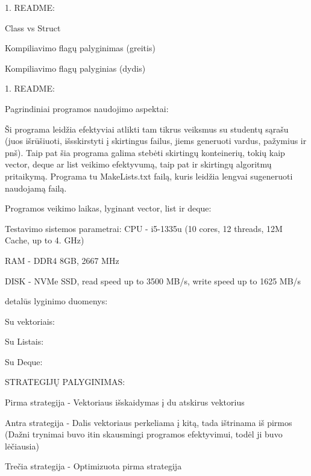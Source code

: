 1. README\+:

Class vs Struct



Kompiliavimo flag\textquotesingle{}ų palyginimas (greitis)



Kompiliavimo flagų palyginias (dydis)



1. README\+:

Pagrindiniai programos naudojimo aspektai\+:

Ši programa leidžia efektyviai atlikti tam tikrus veiksmus su studentų sąrašu (juos išrūšiuoti, išsskirstyti į skirtingus failus, jiems generuoti vardus, pažymius ir pnš). Taip pat šia programa galima stebėti skirtingų konteinerių, tokių kaip vector, deque ar list veikimo efektyvumą, taip pat ir skirtingų algoritmų pritaikymą. Programa tu Make\+Lists.\+txt failą, kuris leidžia lengvai sugeneruoti naudojamą failą.

Programos veikimo laikas, lyginant vector, list ir deque\+:

Testavimo sistemos parametrai\+: CPU -\/ i5-\/1335u (10 cores, 12 threads, 12M Cache, up to 4. GHz)

RAM -\/ DDR4 8GB, 2667 MHz

DISK -\/ NVMe SSD, read speed up to 3500 MB/s, write speed up to 1625 MB/s



detalūs lyginimo duomenys\+:

Su vektoriais\+:

    

Su Listais\+:

    

Su Deque\+:

    

STRATEGIJŲ PALYGINIMAS\+:

Pirma strategija -\/ Vektoriaus išskaidymas į du atskirus vektorius

Antra strategija -\/ Dalis vektoriaus perkeliama į kitą, tada ištrinama iš pirmos (Dažni trynimai buvo itin skausmingi programos efektyvimui, todėl ji buvo lėčiausia)

Trečia strategija -\/ Optimizuota pirma strategija

 